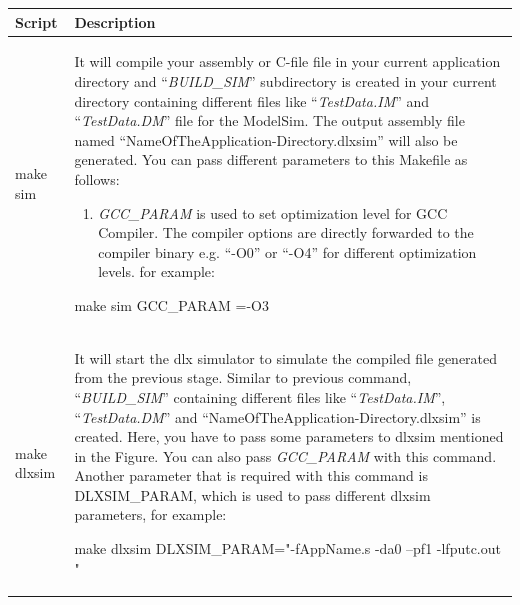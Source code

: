 \documentclass[
]{article}
\begin{document}
\begin{longtable}[]{@{}ll@{}}
\toprule
\textbf{Script} & \textbf{Description}\tabularnewline
\midrule
\endhead
\begin{minipage}[t]{0.47\columnwidth}\raggedright
make sim\strut
\end{minipage} & \begin{minipage}[t]{0.47\columnwidth}\raggedright
It will compile your assembly or C-file file in your current application
directory and ``\emph{BUILD\_SIM}'' subdirectory is created in your
current directory containing different files like ``\emph{TestData.IM}''
and ``\emph{TestData.DM}'' file for the ModelSim. The output assembly
file named ``NameOfTheApplication-Directory.dlxsim'' will also be
generated. You can pass different parameters to this Makefile as
follows:

\begin{enumerate}
\def\labelenumi{\roman{enumi}.}
\item
  \emph{GCC\_PARAM} is used to set optimization level for GCC Compiler.
  The compiler options are directly forwarded to the compiler binary
  e.g. ``-O0'' or ``-O4'' for different optimization levels. for
  example:
\end{enumerate}

make sim GCC\_PARAM =-O3\strut
\end{minipage}\tabularnewline
\begin{minipage}[t]{0.47\columnwidth}\raggedright
make dlxsim\strut
\end{minipage} & \begin{minipage}[t]{0.47\columnwidth}\raggedright
It will start the dlx simulator to simulate the compiled file generated
from the previous stage. Similar to previous command,
``\emph{BUILD\_SIM}'' containing different files like
``\emph{TestData.IM}'', ``\emph{TestData.DM}'' and
``NameOfTheApplication-Directory.dlxsim'' is created. Here, you have to
pass some parameters to dlxsim mentioned in the Figure. You can also
pass \emph{GCC\_PARAM} with this command. Another parameter that is
required with this command is DLXSIM\_PARAM, which is used to pass
different dlxsim parameters, for example:

make dlxsim DLXSIM\_PARAM="-fAppName.s -da0 --pf1 -lfputc.out "


\end{minipage}
\end{longtable}
\end{document}
